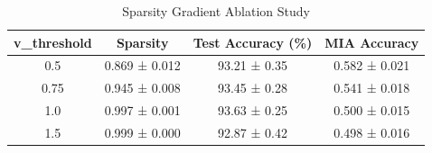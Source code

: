 \begin{table}[!t]
\centering
\caption{Sparsity Gradient Ablation Study}
\label{tab:ablation}
\begin{tabular}{c c c c}
\toprule
v\_threshold & Sparsity & Test Accuracy (\%) & MIA Accuracy \\
\midrule
0.5 & 0.869 ± 0.012 & 93.21 ± 0.35 & 0.582 ± 0.021 \\
0.75 & 0.945 ± 0.008 & 93.45 ± 0.28 & 0.541 ± 0.018 \\
1.0 & 0.997 ± 0.001 & 93.63 ± 0.25 & 0.500 ± 0.015 \\
1.5 & 0.999 ± 0.000 & 92.87 ± 0.42 & 0.498 ± 0.016 \\
\bottomrule
\end{tabular}
\end{table}